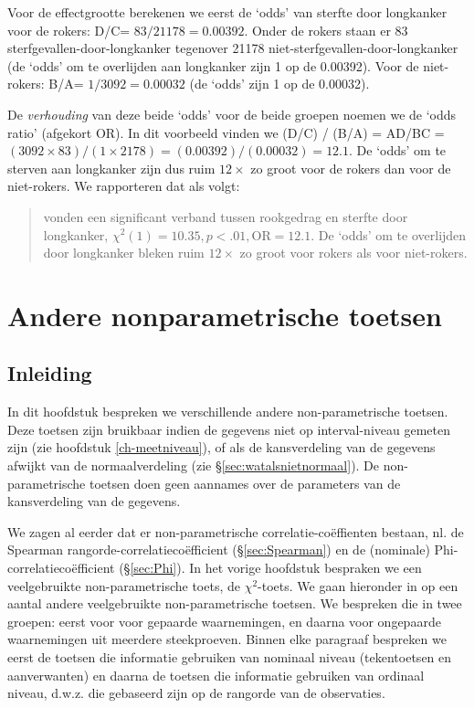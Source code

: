 \documentclass[
]{book}
\begin{document}
Voor de effectgrootte berekenen we eerst de `odds' van sterfte door
longkanker voor de rokers: D/C= \(83/21178 =0.00392\). Onder de rokers
staan er 83 sterfgevallen-door-longkanker tegenover 21178
niet-sterfgevallen-door-longkanker (de `odds' om te overlijden aan
longkanker zijn 1 op de 0.00392). Voor de niet-rokers: B/A=
\(1/3092 =0.00032\) (de `odds' zijn 1 op de 0.00032).

De \emph{verhouding} van deze beide `odds' voor de beide groepen noemen we de
`odds ratio' (afgekort OR). In dit voorbeeld vinden we (D/C) / (B/A) =
AD/BC =
\((3092 \times 83) / (1 \times 2178) = (0.00392)/(0.00032) = 12.1\). De
`odds' om te sterven aan longkanker zijn dus ruim \(12\times\) zo groot
voor de rokers dan voor de niet-rokers. We rapporteren dat als volgt:

\begin{quote}
\citet{DollHill1956} vonden een significant verband tussen
rookgedrag en sterfte door longkanker,
\(\chi^2(1)=10.35, p<.01, \textrm{OR}=12.1\). De `odds' om te overlijden
door longkanker bleken ruim \(12\times\) zo groot voor rokers als voor
niet-rokers.
\end{quote}

\chapter{Andere nonparametrische toetsen}\label{ch-andere-nonpar-toetsen}

\section{Inleiding}\label{sec:h17inleiding}

In dit hoofdstuk bespreken we verschillende andere non-parametrische
toetsen. Deze toetsen zijn bruikbaar indien de gegevens niet op
interval-niveau gemeten zijn (zie hoofdstuk
\ref{ch-meetniveau}), of als de kansverdeling van de gegevens
afwijkt van de normaalverdeling (zie
§\ref{sec:watalsnietnormaal}). De non-parametrische toetsen doen
geen aannames over de parameters van de kansverdeling van de gegevens.

We zagen al eerder dat er non-parametrische correlatie-coëffienten
bestaan, nl. de Spearman rangorde-correlatiecoëfficient
(§\ref{sec:Spearman}) en de (nominale) Phi-correlatiecoëfficient
(§\ref{sec:Phi}). In
het vorige hoofdstuk bespraken we een veelgebruikte non-parametrische
toets, de \(\chi^2\)-toets. We gaan hieronder in op een aantal andere veelgebruikte
non-parametrische toetsen. We bespreken die in twee groepen: eerst voor
voor gepaarde waarnemingen, en daarna voor ongepaarde waarnemingen uit
meerdere steekproeven. Binnen elke paragraaf bespreken we eerst de
toetsen die informatie gebruiken van nominaal niveau (tekentoetsen en
aanverwanten) en daarna de toetsen die informatie gebruiken van ordinaal
niveau, d.w.z. die gebaseerd zijn op de rangorde van de observaties.
\end{document}
